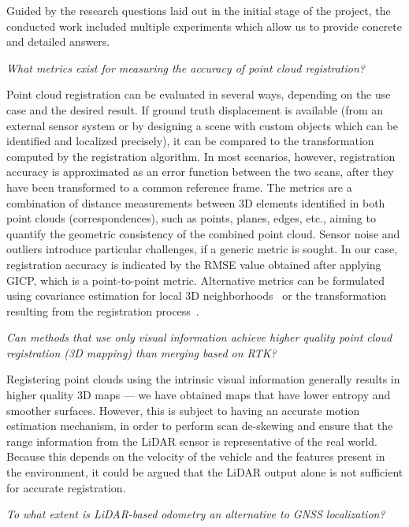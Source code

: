 Guided by the research questions laid out in the initial stage of the project, the conducted work included multiple experiments which allow us to provide concrete and detailed answers.
\begin{compactenum}
    \item \textit{What metrics exist for measuring the accuracy of point cloud registration?}

    Point cloud registration can be evaluated in several ways, depending on the use case and the desired result. If ground truth displacement is available (\eg from an external sensor system or by designing a scene with custom objects which can be identified and localized precisely), it can be compared to the transformation computed by the registration algorithm.
    In most scenarios, however, registration accuracy is approximated as an error function between the two scans, after they have been transformed to a common reference frame. The metrics are a combination of distance measurements between 3D elements identified in both point clouds (correspondences), such as points, planes, edges, etc., aiming to quantify the geometric consistency of the combined point cloud. Sensor noise and outliers introduce particular challenges, if a generic metric is sought. In our case, registration accuracy is indicated by the RMSE value obtained after applying GICP, which is a point-to-point metric. Alternative metrics can be formulated using covariance estimation for local 3D neighborhoods~\cite{adolfsson2021coral} or the transformation resulting from the registration process~\cite{censi2007accurate}.

    \item \textit{Can methods that use only visual information achieve higher quality point cloud registration (3D mapping) than merging based on RTK?}

    Registering point clouds using the intrinsic visual information generally results in higher quality 3D maps --- we have obtained maps that have lower entropy and smoother surfaces. However, this is subject to having an accurate motion estimation mechanism, in order to perform scan de-skewing and ensure that the range information from the LiDAR sensor is representative of the real world. Because this depends on the velocity of the vehicle and the features present in the environment, it could be argued that the LiDAR output alone is not sufficient for accurate registration.

    \item \textit{To what extent is LiDAR-based odometry an alternative to GNSS localization?}


\end{compactenum}
